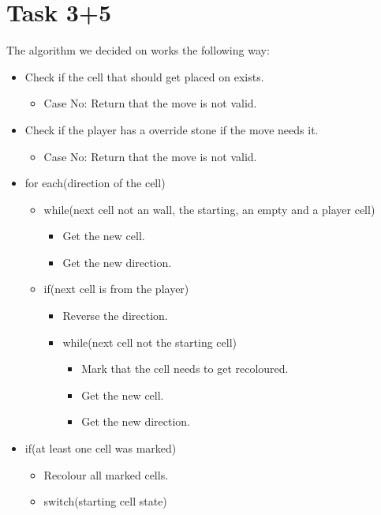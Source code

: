 \section{Task 3+5}
The algorithm we decided on works the following way:\\

\begin{itemize}
	\item Check if the cell that should get placed on exists.
	\begin{itemize}
		\item Case No: Return that the move is not valid.
	\end{itemize}
	\item Check if the player has a override stone if the move needs it.
	\begin{itemize}
		\item Case No: Return that the move is not valid.
	\end{itemize}
	\item for each(direction of the cell)
	\begin{itemize}
		\item while(next cell not an wall, the starting, an empty and a player cell)
		\begin{itemize}
			\item Get the new cell.
			\item Get the new direction.
		\end{itemize}
		\item if(next cell is from the player)
		\begin{itemize}
			\item Reverse the direction.
			\item while(next cell not the starting cell)
			\begin{itemize}
				\item Mark that the cell needs to get recoloured.
				\item Get the new cell.
				\item Get the new direction.
			\end{itemize}
		\end{itemize}
	\end{itemize}
	\item if(at least one cell was marked)
	\begin{itemize}
		\item Recolour all marked cells.
		\item switch(starting cell state)
		\begin{itemize}

\end{itemize}
\end{itemize}
\end{itemize}
